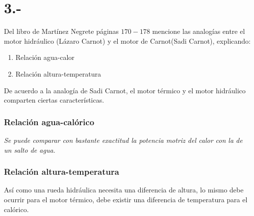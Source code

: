 \documentclass{article}
\begin{document}
\section*{3.-}
Del libro de Martínez Negrete páginas $170-178$ mencione las analogías entre el motor hidráulico
(Lázaro Carnot) y el motor de Carnot(Sadi Carnot), explicando:
\begin{enumerate}
    \item Relación agua-calor 
    \item Relación altura-temperatura
\end{enumerate}
\begin{tcolorbox}[breakable]
    De acuerdo a la analogía de Sadi Carnot, el motor térmico y el motor hidráulico comparten ciertas 
    características.
    \subsubsection*{Relación agua-calórico}
    \textit{Se puede comparar con bastante exactitud la potencia motriz del calor con la de un salto de agua.}
    \subsubsection*{Relación altura-temperatura}
    Así como una rueda hidráulica necesita una diferencia de altura, lo mismo debe ocurrir para el motor 
    térmico, debe existir una diferencia de temperatura para el calórico. 
\end{tcolorbox}
\end{document}
